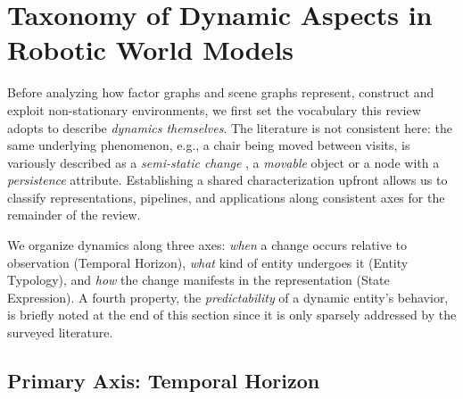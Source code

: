 \section{Taxonomy of Dynamic Aspects in Robotic World Models}\label{sec:taxonomy_dynamics}
Before analyzing how factor graphs and scene graphs represent, construct and exploit non-stationary environments, we first set the vocabulary this review adopts to describe \textit{dynamics themselves}. 
The literature is not consistent here: the same underlying phenomenon, e.g., a chair being moved between visits, is variously described as a \textit{semi-static change} \cite{gomez_object-based_2020}, a \textit{movable} object \cite{brink_using_2016} or a node with a \textit{persistence} attribute\cite{behrens_lost_2025}.
Establishing a shared characterization upfront allows us to classify representations, pipelines, and applications along consistent axes for the remainder of the review.

We organize dynamics along three axes: 
\emph{when} a change occurs relative to observation (Temporal Horizon),
\emph{what} kind of entity undergoes it (Entity Typology),
and \emph{how} the change manifests in the representation (State Expression).
A fourth property, the \emph{predictability} of a dynamic entity's behavior, is briefly noted at the end of this section since it is only sparsely addressed by the surveyed literature.

\subsection{Primary Axis: Temporal Horizon}\label{sec:taxonomy_temporal_horizon}

